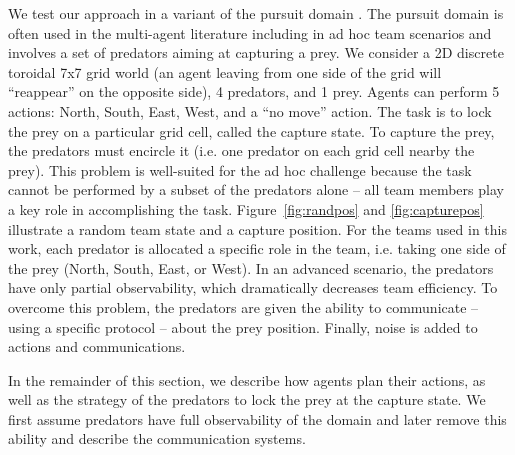 We test our approach in a variant of the pursuit domain \cite{benda1986empirical}. The pursuit domain is often used in the multi-agent literature \cite{stone2000multiagent} including in ad hoc team scenarios \cite{barrett2011empirical} and involves a set of predators aiming at capturing a prey. We consider a 2D discrete toroidal 7x7 grid world (an agent leaving from one side of the grid will ``reappear'' on the opposite side), 4 predators, and 1 prey. Agents can perform 5 actions: North, South, East, West, and a ``no move'' action. The task is to lock the prey on a particular grid cell, called the capture state. To capture the prey, the predators must encircle it (i.e. one predator on each grid cell nearby the prey). This problem is well-suited for the ad hoc challenge because the task cannot be performed by a subset of the predators alone -- all team members play a key role in accomplishing the task. Figure~\ref{fig:randpos} and \ref{fig:capturepos} illustrate a random team state and a capture position. For the teams used in this work, each predator is allocated a specific role in the team, i.e. taking one side of the prey (North, South, East, or West). In an advanced scenario, the predators have only partial observability, which dramatically decreases team efficiency. To overcome this problem, the predators are given the ability to communicate -- using a specific protocol -- about the prey position. Finally, noise is added to actions and communications.



In the remainder of this section, we describe how agents plan their actions, as well as the strategy of the predators to lock the prey at the capture state. We first assume predators have full observability of the domain and later remove this ability and describe the communication systems.

